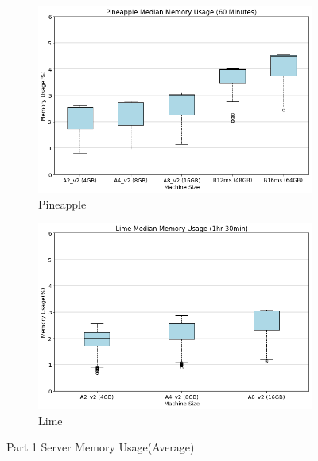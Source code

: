 \begin{figure}[H]
     \centering
     \begin{subfigure}[b]{0.49\textwidth}
         \centering
         \includegraphics[width=\textwidth]{images/pineapple_mem.png}
         \caption{Pineapple}
         \label{fig:pineapple_cpu}
     \end{subfigure}
     \hfill
     \begin{subfigure}[b]{0.49\textwidth}
         \centering
         \includegraphics[width=\textwidth]{images/lime_mem.png}
         \caption{Lime}
         \label{fig:lime_cpu}
     \end{subfigure}
    
        \caption{Part 1 Server Memory Usage(Average)}
        \label{fig:part_1_cpu}
\end{figure}

